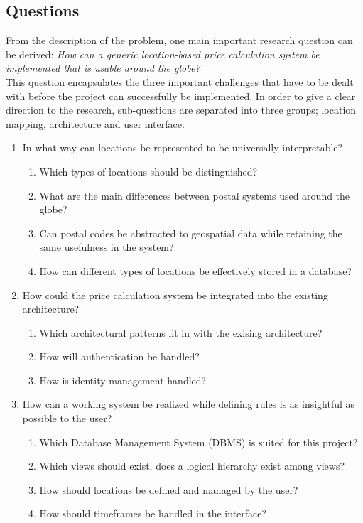 \subsection{Questions}

From the description of the problem, one main important research question can be derived: \textit{How can a generic location-based price calculation system be implemented that is usable around the globe?} \\

This question encapsulates the three important challenges that have to be dealt with before the project can successfully be implemented. In order to give a clear direction to the research, sub-questions are separated into three groups; location mapping, architecture and user interface.

\begin{enumerate}

	\item In what way can locations be represented to be universally interpretable?
	      \begin{enumerate}[label*=\arabic*.]
		      \item Which types of locations should be distinguished?
		      \item What are the main differences between postal systems used around the globe?
		      \item Can postal codes be abstracted to geospatial data while retaining the same usefulness in the system?
		      \item How can different types of locations be effectively stored in a database?
	      \end{enumerate}

	\item How could the price calculation system be integrated into the existing architecture?
	      \begin{enumerate}[label*=\arabic*.]
		      \item Which architectural patterns fit in with the exising architecture?
		      \item How will authentication be handled?
		      \item How is identity management handled?
	      \end{enumerate}

	\item How can a working system be realized while defining rules is as insightful as possible to the user?
	      \begin{enumerate}[label*=\arabic*.]
		      \item Which Database Management System (DBMS) is suited for this project?
		      \item Which views should exist, does a logical hierarchy exist among views?
		      \item How should locations be defined and managed by the user?
		      \item How should timeframes be handled in the interface?
	      \end{enumerate}

\end{enumerate}

